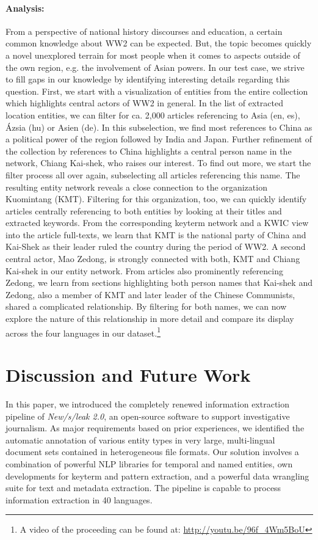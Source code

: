 \documentclass[11pt,a4paper]{article}
\begin{document}
\paragraph{Analysis:}
From a perspective of national history discourses and education, a certain common knowledge about WW2 can be expected. But, the topic becomes quickly a novel unexplored terrain for most people when it comes to aspects outside of the own region, e.g. the involvement of Asian powers. In our test case, we strive to fill gaps in our knowledge by identifying interesting details regarding this question. First, we start with a visualization of entities from the entire collection which highlights central actors of WW2 in general. In the list of extracted location entities, we can filter for ca. 2,000 articles referencing to Asia (en, es), \'{A}zsia (hu) or Asien (de). In this subselection, we find most references to China as a political power of the region followed by India and Japan. Further refinement of the collection by references to China highlights a central person name in the network, Chiang Kai-shek, who raises our interest. To find out more, we start the filter process all over again, subselecting all articles referencing this name. The resulting entity network reveals a close connection to the organization Kuomintang (KMT). Filtering for this organization, too, we can quickly identify articles centrally referencing to both entities by looking at their titles and extracted keywords. From the corresponding keyterm network and a KWIC view into the article full-texts, we learn that KMT is the national party of China and Kai-Shek as their leader ruled the country during the period of WW2. A second central actor, Mao Zedong, is strongly connected with both, KMT and Chiang Kai-shek in our entity network. From articles also prominently referencing Zedong, we learn from sections highlighting both person names that Kai-shek and Zedong, also a member of KMT and later leader of the Chinese Communists, shared a complicated relationship. By filtering for both names, we can now explore the nature of this relationship in more detail and compare its display across the four languages in our dataset.\footnote{A video of the proceeding can be found at: \url{http://youtu.be/96f_4Wm5BoU}} 


\section{Discussion and Future Work}

In this paper, we introduced the completely renewed information extraction pipeline of \emph{New/s/leak 2.0}, an open-source software to support investigative journalism. 
As major requirements based on prior experiences, we identified the automatic annotation of various entity types in very large, multi-lingual document sets contained in heterogeneous file formats.
Our solution involves a combination of powerful NLP libraries for temporal and named entities, own developments for keyterm and pattern extraction, and a powerful data wrangling suite for text and metadata extraction.
The pipeline is capable to process information extraction in 40 languages.
\end{document}

